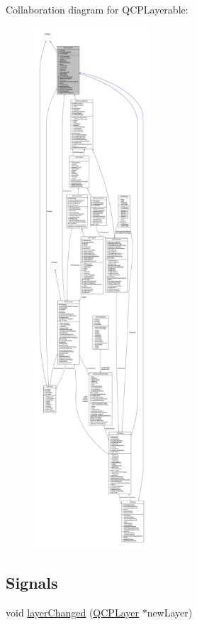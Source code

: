 Collaboration diagram for Q\+C\+P\+Layerable\+:\nopagebreak
\begin{figure}[H]
\begin{center}
\leavevmode
\includegraphics[height=550pt]{class_q_c_p_layerable__coll__graph}
\end{center}
\end{figure}
\subsection*{Signals}
\begin{DoxyCompactItemize}
\item 
void \hyperlink{class_q_c_p_layerable_abbf8657cedea73ac1c3499b521c90eba}{layer\+Changed} (\hyperlink{class_q_c_p_layer}{Q\+C\+P\+Layer} $\ast$new\+Layer)
\end{DoxyCompactItemize}
